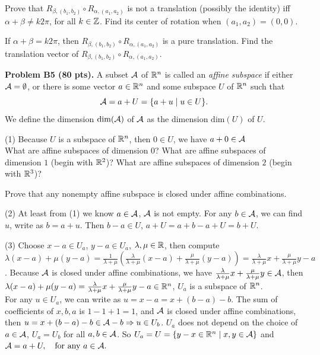 \documentclass[12pt]{article}
\begin{document}
\medskip
Prove that  $R_{\beta, (b_1,b_2)} \circ R_{\alpha, (a_1,a_2)}$ is
not a translation (possibly the identity)  iff
$\alpha + \beta \not= k 2\pi$, for all  $k\in \mathbb{Z}$.
Find its center of rotation when $(a_1, a_2) = (0, 0)$.  

\medskip
If $\alpha + \beta = k 2\pi$, then  $R_{\beta, (b_1,b_2)} \circ
R_{\alpha, (a_1,a_2)}$
is a pure translation. 
Find the translation vector 
of $R_{\beta, (b_1,b_2)} \circ R_{\alpha, (a_1,a_2)}$.


\vspace {0.5cm}\noindent
{\bf Problem B5 (80 pts).}
A subset ${\cal A}$ of $\mathbb{R}^n$ is called an {\it affine subspace\/} if
either ${\cal A} = \emptyset$, or there is some vector $a\in \mathbb{R}^n$
and some subspace $U$ of $\mathbb{R}^n$ such that
\[
{\cal A} = a + U = \{a + u \mid u \in U\}.
\]
We define the dimension $\mathrm{dim}({\cal A})$ of ${\cal A}$ as the dimension
$\mathrm{dim}(U)$ of $U$.

\medskip
(1)
Because $U$ is a subspace of $\mathbb{R}^n$, then $0 \in U$, we have $
a + 0 \in {\cal A}$
\medskip \\
What are affine subspaces of dimension $0$?
What are affine subspaces of dimension $1$ (begin with $\mathbb{R}^2$)?
What are affine subspaces of dimension $2$ (begin with $\mathbb{R}^3$)?

\medskip
Prove that any nonempty affine subspace is closed under affine
combinations.

\medskip
(2) At least from (1) we know $a \in {\cal A}$, ${\cal A}$ is not empty.
For any $b \in {\cal A}$, we can find $u$, write as $b = a + u$. Then   $b - a \in U$, $a + U = a + b - a + U = b + U$.

\medskip
(3)
Choose $x - a \in U_a$, $y - a \in U_a$, $\lambda, \mu \in \mathbb{R}$, then compute $\lambda (x - a) + \mu (y - a) = \frac{1}{\lambda + \mu}(\frac{\lambda}{\lambda + \mu}(x - a) + \frac{\mu}{\lambda + \mu}(y - a)) = \frac{\lambda}{\lambda + \mu} x + \frac{\mu}{\lambda + \mu} y - a$. Because ${\cal A}$ is closed under affine combinations, we have $\frac{\lambda}{\lambda + \mu} x + \frac{\mu}{\lambda + \mu} y \in {\cal A}$, then $\lambda (x - a) + \mu (y - a) = \frac{\lambda}{\lambda + \mu} x + \frac{\mu}{\lambda + \mu} y - a \in \mathbb{R}^n$, $U_a$ is a subspace of $\mathbb{R}^n$.\\
For any $u \in U_a$, we can write as $u = x - a = x + (b - a) - b$. The sum of coefficients of $x, b, a$ is $1 -1 + 1 = 1$, and ${\cal A}$ is closed under affine combinations, then $u = x + (b -a)-b \in {\cal A} - b \Rightarrow u \in U_b$. $U_a$ does not depend on the choice of $a \in {\cal A}$, $U_a = U_b$ for all $a, b\in {\cal A}$.
So $U_a = U = \{y - x \in \mathbb{R}^n \mid x, y \in {\cal A}\}$ and
$
{\cal A} = a + U, \quad\hbox{for any $a\in {\cal A}$}.
$
\end{document}
